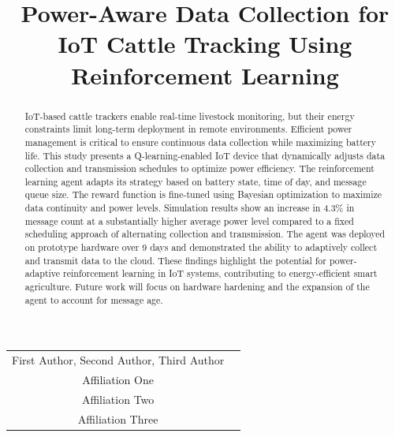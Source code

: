 \documentclass[10pt]{cai}
\begin{document}
\def\conferenceyear{2025}
\begin{center}

\title{Power-Aware Data Collection for IoT Cattle Tracking Using Reinforcement Learning}
\maketitle

\thispagestyle{empty}

\begin{tabular}{cc}
First Author\upstairs{\affilone,*}, Second Author\upstairs{\affilone}, Third Author\upstairs{\affilthree}
\\[0.25ex]
{\small \upstairs{\affilone} Affiliation One} \\
{\small \upstairs{\affiltwo} Affiliation Two} \\
{\small \upstairs{\affilthree} Affiliation Three} \\
\end{tabular}
  
\vspace*{0.2in}
\end{center}

\begin{abstract}
IoT-based cattle trackers enable real-time livestock monitoring, but their energy constraints limit long-term deployment in remote environments.
Efficient power management is critical to ensure continuous data collection while maximizing battery life.
This study presents a Q-learning-enabled IoT device that dynamically adjusts data collection and transmission schedules to optimize power efficiency.
The reinforcement learning agent adapts its strategy based on battery state, time of day, and message queue size.
The reward function is fine-tuned using Bayesian optimization to maximize data continuity and power levels.
Simulation results show an increase in 4.3\% in message count at a substantially higher average power level compared to a fixed scheduling approach of alternating collection and transmission.
The agent was deployed on prototype hardware over 9 days and demonstrated the ability to adaptively collect and transmit data to the cloud. 
These findings highlight the potential for power-adaptive reinforcement learning in IoT systems, contributing to energy-efficient smart agriculture.
Future work will focus on hardware hardening and the expansion of the agent to account for message age.

\end{abstract}
\end{document}
